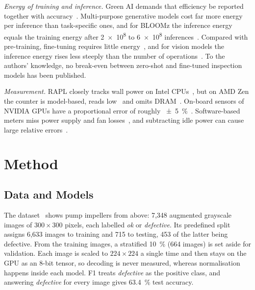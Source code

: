 \documentclass[conference]{IEEEtran}
\begin{document}
\emph{Energy of training and inference.} Green AI demands that efficiency be reported together with
accuracy~\cite{schwartz2020greenai}. Multi-purpose generative models cost
far more energy per inference than task-specific ones, and for BLOOMz the inference energy equals the
training energy after \num{2e8} to \num{6e8} inferences~\cite{luccioni2024power}. Compared
with pre-training, fine-tuning requires little energy~\cite{wang2023finetuning}, and for vision models
the inference energy rises less steeply than the number of operations~\cite{desislavov2023trends}. To the authors' knowledge, no break-even between
zero-shot and fine-tuned inspection models has been published.

\emph{Measurement.} RAPL closely tracks wall power on Intel CPUs~\cite{khan2018rapl}, but on AMD Zen
the counter is model-based, reads low~\cite{schoene2021zen2} and omits DRAM~\cite{raffin2025rapl}.
On-board sensors of NVIDIA GPUs have a proportional error of roughly
\SI{\pm5}{\percent}~\cite{yang2024gpupower}. Software-based meters miss power supply and fan
losses~\cite{jay2023softwaremeters}, and subtracting idle power can cause large relative
errors~\cite{fahad2019comparative}.

\section{Method}
\subsection{Data and Models}
The dataset~\cite{dabhi2020casting} shows pump impellers from above: 7,348 augmented grayscale images of
$300{\times}300$ pixels, each labelled \emph{ok} or \emph{defective}. Its predefined split assigns 6,633
images to training and 715 to testing, 453 of the latter being defective. From the training images, a
stratified \SI{10}{\percent} (664 images) is set aside for validation. Each image is scaled to
$224{\times}224$ a single time and then stays on the GPU as an 8-bit tensor, so decoding is never measured, whereas
normalisation happens inside each model. F1 treats \emph{defective} as the positive
class, and answering \emph{defective} for every image gives \SI{63.4}{\percent} test accuracy.
\end{document}
